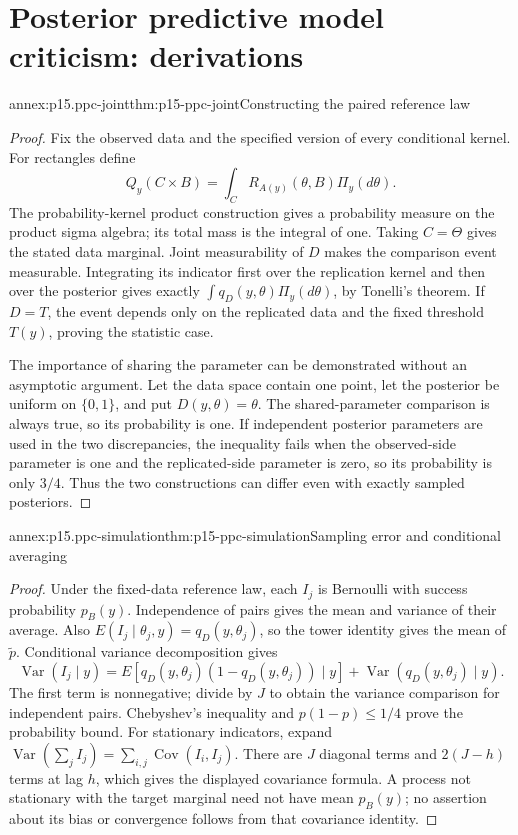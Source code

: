 \section{Posterior predictive model criticism: derivations}
\label{sec:annex-p15-posterior-predictive-model-criticism}

\begin{annexitem}{annex:p15.ppc-joint}{thm:p15-ppc-joint}{Constructing the paired reference law}
\begin{proof}
Fix the observed data and the specified version of every conditional kernel.
For rectangles define
\[
 Q_y(C\times B)=\int_C R_{A(y)}(\theta,B)\Pi_y(d\theta).
\]
The probability-kernel product construction gives a probability measure
on the product sigma algebra; its total mass is the integral of one.
Taking \(C=\Theta\) gives the stated data marginal. Joint measurability
of \(D\) makes the comparison event measurable. Integrating its indicator
first over the replication kernel and then over the posterior gives exactly
\(\int q_D(y,\theta)\Pi_y(d\theta)\), by Tonelli's theorem.
If \(D=T\), the event depends only on the replicated data and the fixed
threshold \(T(y)\), proving the statistic case.

The importance of sharing the parameter can be demonstrated without an
asymptotic argument. Let the data space contain one point, let the posterior
be uniform on \(\{0,1\}\), and put \(D(y,\theta)=\theta\).
The shared-parameter comparison is always true, so its probability is one.
If independent posterior parameters are used in the two discrepancies,
the inequality fails when the observed-side parameter is one and the
replicated-side parameter is zero, so its probability is only \(3/4\).
Thus the two constructions can differ even with exactly sampled posteriors.
\end{proof}
\end{annexitem}

\begin{annexitem}{annex:p15.ppc-simulation}{thm:p15-ppc-simulation}{Sampling error and conditional averaging}
\begin{proof}
Under the fixed-data reference law, each \(I_j\) is Bernoulli with
success probability \(p_B(y)\). Independence of pairs gives the mean
and variance of their average. Also
\(E(I_j\mid\theta_j,y)=q_D(y,\theta_j)\), so the tower identity
gives the mean of \(\widetilde p\). Conditional variance decomposition
gives
\[
 \operatorname{Var}(I_j\mid y)=
 E[q_D(y,\theta_j)(1-q_D(y,\theta_j))\mid y]
 +\operatorname{Var}(q_D(y,\theta_j)\mid y).
\]
The first term is nonnegative; divide by \(J\) to obtain the variance
comparison for independent pairs. Chebyshev's inequality and
\(p(1-p)\leq1/4\) prove the probability bound.
For stationary indicators, expand
\(\operatorname{Var}(\sum_jI_j)=\sum_{i,j}\operatorname{Cov}(I_i,I_j)\).
There are \(J\) diagonal terms and \(2(J-h)\) terms at lag \(h\),
which gives the displayed covariance formula. A process not stationary
with the target marginal need not have mean \(p_B(y)\); no assertion
about its bias or convergence follows from that covariance identity.
\end{proof}
\end{annexitem}

